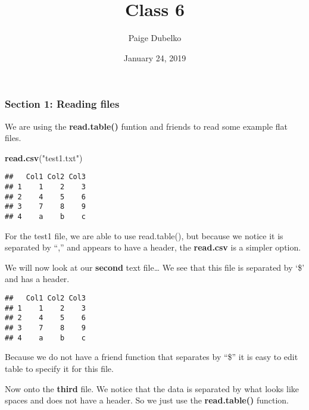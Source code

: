 \documentclass[]{article}
\title{Class 6}
\author{Paige Dubelko}
\date{January 24, 2019}
\newenvironment{Shaded}{\begin{snugshade}}{\end{snugshade}}
\newcommand{\KeywordTok}[1]{\textcolor[rgb]{0.13,0.29,0.53}{\textbf{#1}}}
\newcommand{\DataTypeTok}[1]{\textcolor[rgb]{0.13,0.29,0.53}{#1}}
\newcommand{\StringTok}[1]{\textcolor[rgb]{0.31,0.60,0.02}{#1}}
\newcommand{\OtherTok}[1]{\textcolor[rgb]{0.56,0.35,0.01}{#1}}
\newcommand{\NormalTok}[1]{#1}
\begin{document}
\maketitle

\subsubsection{Section 1: Reading files}\label{section-1-reading-files}

We are using the \textbf{read.table()} funtion and friends to read some
example flat files.

\begin{Shaded}
\begin{Highlighting}[]
\KeywordTok{read.csv}\NormalTok{(}\StringTok{"test1.txt"}\NormalTok{)}
\end{Highlighting}
\end{Shaded}

\begin{verbatim}
##   Col1 Col2 Col3
## 1    1    2    3
## 2    4    5    6
## 3    7    8    9
## 4    a    b    c
\end{verbatim}

For the test1 file, we are able to use read.table(), but because we
notice it is separated by ``,'' and appears to have a header, the
\textbf{read.csv} is a simpler option.

We will now look at our \textbf{second} text file\ldots{} We see that
this file is separated by `\$' and has a header.

\begin{Shaded}
\end{Shaded}

\begin{verbatim}
##   Col1 Col2 Col3
## 1    1    2    3
## 2    4    5    6
## 3    7    8    9
## 4    a    b    c
\end{verbatim}

Because we do not have a friend function that separates by ``\$'' it is
easy to edit table to specify it for this file.

Now onto the \textbf{third} file. We notice that the data is separated
by what looks like spaces and does not have a header. So we just use the
\textbf{read.table()} function.
\end{document}
